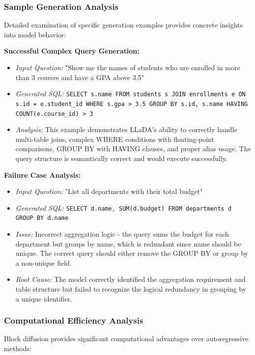 \documentclass[a4paper,12pt]{article}
\begin{document}
\subsubsection*{Sample Generation Analysis}
Detailed examination of specific generation examples provides concrete insights into model behavior:

\textbf{Successful Complex Query Generation:}
\begin{itemize}
    \item \textit{Input Question:} "Show me the names of students who are enrolled in more than 3 courses and have a GPA above 3.5"
    \item \textit{Generated SQL:} \texttt{SELECT s.name FROM students s JOIN enrollments e ON s.id = e.student\_id WHERE s.gpa > 3.5 GROUP BY s.id, s.name HAVING COUNT(e.course\_id) > 3}
    \item \textit{Analysis:} This example demonstrates LLaDA's ability to correctly handle multi-table joins, complex WHERE conditions with floating-point comparisons, GROUP BY with HAVING clauses, and proper alias usage. The query structure is semantically correct and would execute successfully.
\end{itemize}

\textbf{Failure Case Analysis:}
\begin{itemize}
    \item \textit{Input Question:} "List all departments with their total budget"
    \item \textit{Generated SQL:} \texttt{SELECT d.name, SUM(d.budget) FROM departments d GROUP BY d.name}
    \item \textit{Issue:} Incorrect aggregation logic - the query sums the budget for each department but groups by name, which is redundant since name should be unique. The correct query should either remove the GROUP BY or group by a non-unique field.
    \item \textit{Root Cause:} The model correctly identified the aggregation requirement and table structure but failed to recognize the logical redundancy in grouping by a unique identifier.
\end{itemize}

\subsubsection*{Computational Efficiency Analysis}
Block diffusion provides significant computational advantages over autoregressive methods:
\end{document}
